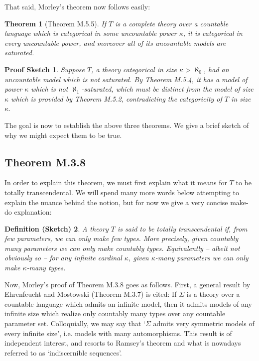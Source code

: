 \documentclass{article}
\newtheorem{theorem}{Theorem}[section]
\newtheorem{defsketch}[theorem]{Definition (Sketch)}
\theoremstyle{nonumberplain}
\newtheorem{sketch}{Proof Sketch}
\begin{document}
That said, Morley's theorem now follows easily:

\begin{theorem}[Theorem M.5.5]
If $T$ is a complete theory over a countable language which is categorical in some uncountable power $\kappa$, it is categorical in every uncountable power, and moreover all of its uncountable models are saturated.
\end{theorem}

\begin{sketch}
Suppose $T$, a theory categorical in size $\kappa > \aleph_0$, had an uncountable model which is not saturated. By Theorem M.5.4, it has a model of power $\kappa$ which is not $\aleph_1$-saturated, which must be distinct from the model of size $\kappa$ which is provided by Theorem M.5.2, contradicting the categoricity of $T$ in size $\kappa$.
\end{sketch}

The goal is now to establish the above three theorems. We give a brief sketch of why we might expect them to be true.

\subsection{Theorem M.3.8}

In order to explain this theorem, we must first explain what it means for $T$ to be totally transcendental. We will spend many more words below attempting to explain the nuance behind the notion, but for now we give a very concise make-do explanation:
\begin{defsketch}\label{defsketch:tt}
A theory $T$ is said to be totally transcendental if, from few parameters, we can only make few types. More precisely, given countably many parameters we can only make countably types. Equivalently -- albeit not obviously so -- for any infinite cardinal $\kappa$, given $\kappa$-many parameters we can only make $\kappa$-many types.
\end{defsketch}

Now, Morley's proof of Theorem M.3.8 goes as follows. First, a general result by Ehrenfeucht and Mostowski (Theorem M.3.7) is cited: If $\Sigma$ is a theory over a countable language which admits an infinite model, then it admits models of any infinite size which realize only countably many types over any countable parameter set. Colloquially, we may say that `$\Sigma$ admits very symmetric models of every infinite size', i.e. models with many automorphisms. This result is of independent interest, and resorts to Ramsey's theorem and what is nowadays referred to as `indiscernible sequences'.
\end{document}
